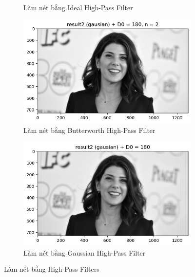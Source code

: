 \documentclass{article}
\begin{document}
\begin{figure}[ht!]
\begin{subfigure}[b]{0.45\linewidth}
                \caption{Làm nét bằng Ideal High-Pass Filter}
            \end{subfigure}
            \begin{subfigure}[b]{0.45\linewidth}
                \includegraphics[width=\linewidth]{fo24c.png}
                \caption{Làm nét bằng Butterworth High-Pass Filter}
            \end{subfigure}
            \begin{subfigure}[b]{0.45\linewidth}
                \includegraphics[width=\linewidth]{fo24b.png}
                \caption{Làm nét bằng Gaussian High-Pass Filter}
            \end{subfigure}
            \caption{Làm nét bằng High-Pass Filters}
            \label{fig26}
        \end{figure}
\end{document}
